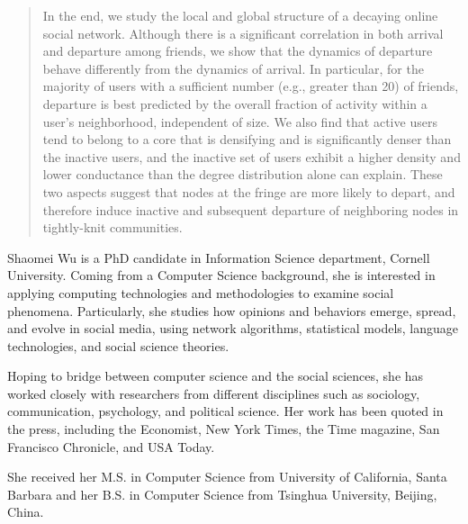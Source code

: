 \documentclass[phd,tocprelim]{cornell}
\begin{document}
\begin{abstract}
In the end, we study the local and global structure of a decaying online social network. Although there is a significant correlation in both arrival and departure among friends, we show that the dynamics of departure behave differently from the dynamics of arrival. 
In particular, for the majority of users with a sufficient number (e.g., greater than 20) of friends, departure is best predicted by the overall fraction of activity within a user's neighborhood, independent of size. We also find that active users tend to belong to a core that is densifying and is significantly denser than the inactive users, and the inactive set of users exhibit a higher density and lower conductance than the degree distribution alone can explain. These two aspects suggest that nodes at the fringe are more likely to depart, and therefore induce inactive and subsequent departure of neighboring nodes in tightly-knit communities.


\end{abstract}

\begin{biosketch}
Shaomei Wu is a PhD candidate in Information Science department, Cornell University. Coming from a Computer Science background, she is interested in applying computing technologies and methodologies to examine social phenomena. Particularly, she studies how opinions and behaviors emerge, spread, and evolve in social media, using network algorithms, statistical models, language technologies, and social science theories.

Hoping to bridge between computer science and the social sciences, she has worked closely with researchers from different disciplines such as sociology, communication, psychology, and political science. Her work has been quoted in the press, including the Economist, New York Times, the Time magazine, San Francisco Chronicle, and USA Today.


She received her M.S. in Computer Science from University of California, Santa Barbara and her B.S. in Computer Science from Tsinghua University, Beijing, China.

\end{biosketch}

\end{document}
